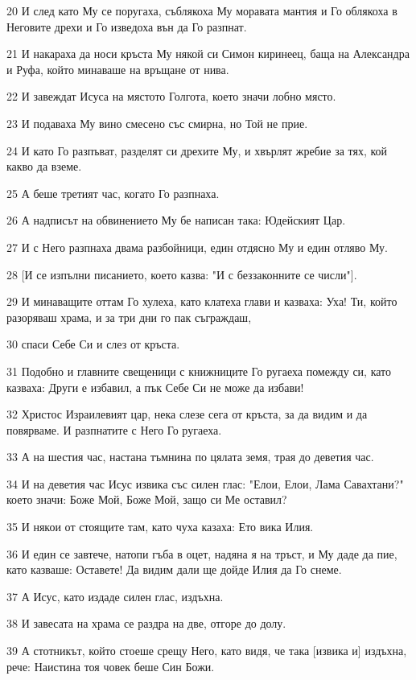 \par 20 И след като Му се поругаха, съблякоха Му моравата мантия и Го облякоха в Неговите дрехи и Го изведоха вън да Го разпнат.
\par 21 И накараха да носи кръста Му някой си Симон киринеец, баща на Александра и Руфа, който минаваше на връщане от нива.
\par 22 И завеждат Исуса на мястото Голгота, което значи лобно място.
\par 23 И подаваха Му вино смесено със смирна, но Той не прие.
\par 24 И като Го разпъват, разделят си дрехите Му, и хвърлят жребие за тях, кой какво да вземе.
\par 25 А беше третият час, когато Го разпнаха.
\par 26 А надписът на обвинението Му бе написан така: Юдейският Цар.
\par 27 И с Него разпнаха двама разбойници, един отдясно Му и един отляво Му.
\par 28 [И се изпълни писанието, което казва: "И с беззаконните се числи"].
\par 29 И минаващите оттам Го хулеха, като клатеха глави и казваха: Уха! Ти, който разоряваш храма, и за три дни го пак съграждаш,
\par 30 спаси Себе Си и слез от кръста.
\par 31 Подобно и главните свещеници с книжниците Го ругаеха помежду си, като казваха: Други е избавил, а пък Себе Си не може да избави!
\par 32 Христос Израилевият цар, нека слезе сега от кръста, за да видим и да повярваме. И разпнатите с Него Го ругаеха.
\par 33 А на шестия час, настана тъмнина по цялата земя, трая до деветия час.
\par 34 И на деветия час Исус извика със силен глас: "Елои, Елои, Лама Савахтани?" което значи: Боже Мой, Боже Мой, защо си Ме оставил?
\par 35 И някои от стоящите там, като чуха казаха: Ето вика Илия.
\par 36 И един се завтече, натопи гъба в оцет, надяна я на тръст, и Му даде да пие, като казваше: Оставете! Да видим дали ще дойде Илия да Го снеме.
\par 37 А Исус, като издаде силен глас, издъхна.
\par 38 И завесата на храма се раздра на две, отгоре до долу.
\par 39 А стотникът, който стоеше срещу Него, като видя, че така [извика и] издъхна, рече: Наистина тоя човек беше Син Божи.
